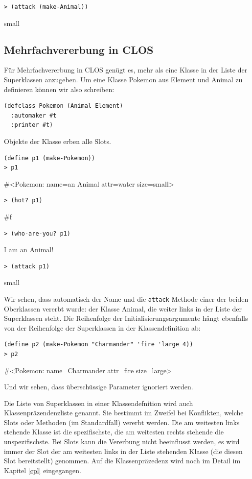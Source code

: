 \begin{lstlisting}
> (attack (make-Animal))
\end{lstlisting}
{\rsymbol small}

\subsection{Mehrfachvererbung in CLOS}
Für Mehrfachvererbung in CLOS genügt es, mehr als eine Klasse in der Liste der Superklassen anzugeben. Um eine Klasse Pokemon aus Element und Animal zu definieren können wir also schreiben:

\begin{lstlisting}
(defclass Pokemon (Animal Element)
  :automaker #t
  :printer #t)
\end{lstlisting}

Objekte der Klasse erben alle Slots.

\begin{lstlisting}
(define p1 (make-Pokemon))
> p1
\end{lstlisting}
{\routput \#<Pokemon: name={\qq}an Animal{\qq} attr=water size=small>}

\begin{lstlisting}
> (hot? p1)
\end{lstlisting}
{\routput \#f}

\begin{lstlisting}
> (who-are-you? p1)
\end{lstlisting}
{\routput {\qq}I am an Animal!\qq}

\begin{lstlisting}
> (attack p1)
\end{lstlisting}
{\rsymbol small}

Wir sehen, dass automatisch der Name und die \texttt{attack}-Methode einer der beiden Oberklassen vererbt wurde: der Klasse Animal, die weiter links in der Liste der Superklassen steht. Die Reihenfolge der Initialisierungsargumente hängt ebenfalls von der Reihenfolge der Superklassen in der Klassendefinition ab:

\begin{lstlisting}
(define p2 (make-Pokemon "Charmander" 'fire 'large 4))
> p2
\end{lstlisting}
{\routput \#<Pokemon: name={\qq}Charmander{\qq} attr=fire size=large>}

Und wir sehen, dass überschüssige Parameter ignoriert werden.

Die Liste von Superklassen in einer Klassendefnition wird auch Klassenpräzendenzliste genannt. Sie bestimmt im Zweifel bei Konflikten, welche Slots oder Methoden (im Standardfall) vererbt werden. Die am weitesten links stehende Klasse ist die spezifischste, die am weitesten rechts stehende die unspezifischste. Bei Slots kann die Vererbung nicht beeinflusst werden, es wird immer der Slot der am weitesten links in der Liste stehenden Klasse (die diesen Slot bereitstellt) genommen. Auf die Klassenpräzedenz wird noch im Detail im Kapitel \ref{cpl} eingegangen.

